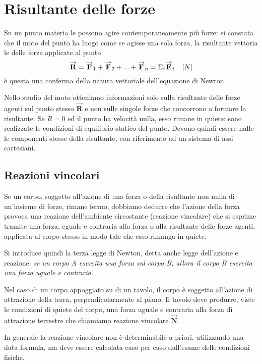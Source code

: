 \documentclass[class=book, crop=false, oneside, 12pt]{standalone}
\begin{document}
\section{Risultante delle forze}
Su un punto materia le possono agire contemporaneamente più forze: si constata che il moto del punto ha luogo come se agisse una sola forza, 
la risultante vettoria le delle forze applicate al punto
\begin{equation*}
    \overrightarrow{\mathbf{R}} = \overrightarrow{\mathbf{F}}_1+\overrightarrow{\mathbf{F}}_2+ ... + \overrightarrow{\mathbf{F}}_n = \Sigma_i \overrightarrow{\mathbf{F}}_i \ \udm{N}
\end{equation*}
è questa una conferma della natura vettoriale dell'equazione di Newton.

Nello studio del moto otteniamo informazioni solo sulla risultante delle forze agenti sul punto stesso \(\overrightarrow{\mathbf{R}}\) e non sulle singole forze che concorrono a formare la risultante.
Se \(R = 0\) ed il punto ha velocità nulla, esso rimane in quiete: sono realizzate le condizioni di equilibrio statico del punto. 
Devono quindi essere nulle le componenti stesse della risultante, con riferimento ad un sistema di assi cartesiani.

\subsection{Reazioni vincolari}

Se un corpo, soggetto all'azione di una forza o della risultante non nulla di un'insieme di forze, rimane fermo, dobbiamo dedurre che l'azione della forza provoca una reazione dell'ambiente circostante (reazione vincolare) che si esprime tramite una forza, eguale e contraria alla forza o alla risultante delle forze agenti,
applicata al corpo stesso in modo tale che esso rimanga in quiete.

Si introduce quindi la terza legge di Newton, detta anche legge dell'azione e reazione: 
\emph{se un corpo A esercita una forza sul corpo B, allora il corpo B esercita una forza uguale e contraria}.

Nel caso di un corpo appoggiato su di un tavolo, il corpo è soggetto all'azione di attrazione della terra, perpendicolarmente al piano.
Il tavolo deve produrre, viste le condizioni di quiete del corpo, una forza uguale e contraria alla forza di attrazione terrestre che chiamiamo reazione vincolare \(\overrightarrow{\mathbf{N}}\).

In generale la reazione vincolare non è determinabile a priori, utilizzando una data formula, ma deve essere calcolata caso per caso dall'esame delle condizioni fisiche. 
\end{document}
